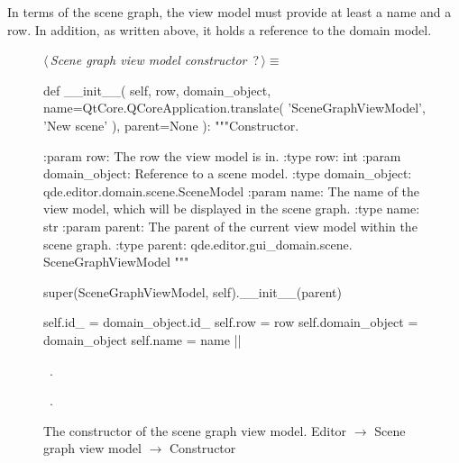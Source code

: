 \documentclass[%
    a4paper,    %
    justified,  %
    nobib,      %
    openany     %
]{tufte-book}
\makeatletter
\renewcommand{\label}[1]{\@tufte@label{##1}}%
\makeatother
\begin{document}
In terms of the scene graph, the view model must provide at least a name and a
row. In addition, as written above, it holds a reference to the domain model.

\begin{figure}
\begin{flushleft} \small
\begin{minipage}{\linewidth}\label{scrap24}\raggedright\small
{} $\langle\,${\itshape Scene graph view model constructor}\nobreak\ {\footnotesize {?}}$\,\rangle\equiv$
\vspace{-1ex}
\begin{pythoncode}
def __init__(
        self,
        row,
        domain_object,
        name=QtCore.QCoreApplication.translate(
            'SceneGraphViewModel', 'New scene'
        ),
        parent=None
):
    """Constructor.

    :param row:           The row the view model is in.
    :type  row:           int
    :param domain_object: Reference to a scene model.
    :type  domain_object: qde.editor.domain.scene.SceneModel
    :param name:          The name of the view model, which will
                          be displayed in the scene graph.
    :type  name:          str
    :param parent:        The parent of the current view model
                          within the scene graph.
    :type parent:         qde.editor.gui_domain.scene.
                          SceneGraphViewModel
    """

    super(SceneGraphViewModel, self).__init__(parent)

    self.id_ = domain_object.id_
    self.row  = row
    self.domain_object = domain_object
    self.name = name
|\NWsep|
\end{pythoncode}
\vspace{1.5ex}
\footnotesize
\begin{list}{}{\setlength{\itemsep}{-\parsep}\setlength{\itemindent}{-\leftmargin}}
\item \NWtxtMacroDefBy\ .
\item \NWtxtMacroRefIn\ .

\item{}
\end{list}
\end{minipage}\vspace{4ex}
\end{flushleft}
\caption{The constructor of the scene graph view model.
  \newline{}\newline{}Editor $\rightarrow$ Scene graph view model $\rightarrow$
  Constructor}
\label{editor:lst:scene-graph-view-model:constructor}
\end{figure}
\end{document}
